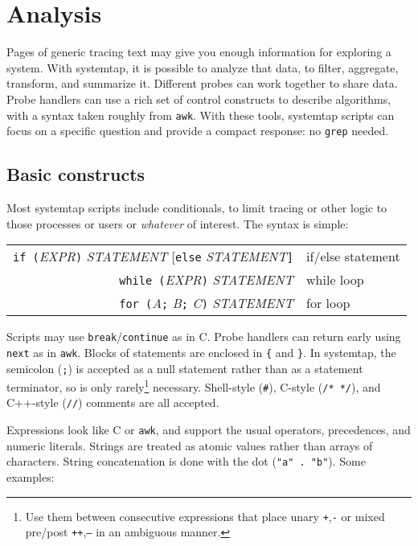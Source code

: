 \documentclass{article}
\renewcommand{\nomenclature}[2]{}
\begin{document}
\section{Analysis}

Pages of generic tracing text may give you enough information for
exploring a system.  With systemtap, it is possible to analyze that
data, to filter, aggregate, transform, and summarize it.  Different
probes can work together to share data.  Probe handlers can use a rich
set of control constructs to describe algorithms, with a syntax taken
roughly from \verb+awk+.  With these tools, systemtap scripts can
focus on a specific question and provide a compact response: no
\verb+grep+ needed.
\nomenclature{awk}{A classic UNIX stream processing language.}

\subsection{Basic constructs}

Most systemtap scripts include conditionals, to limit tracing or other
logic to those processes or users or {\em whatever} of interest.  The
syntax is simple:

\begin{tabular}{rl}
\verb+if (+{\em EXPR}\verb+)+ {\em STATEMENT} [\verb+else+ {\em STATEMENT}\verb+]+ & if/else statement \\
\verb+while (+{\em EXPR}\verb+)+ {\em STATEMENT} & while loop \\
\verb+for (+{\em A}\verb+;+ {\em B}\verb+;+ {\em C}\verb+)+ {\em STATEMENT} & for loop \\
\end{tabular}

Scripts may use \verb+break+/\verb+continue+ as in C.
Probe handlers can return early using \verb+next+ as in \verb+awk+.
Blocks of statements are enclosed in \verb+{+ and \verb+}+.  In
systemtap, the semicolon (\verb+;+) is accepted as a null statement
rather than as a statement terminator, so is only rarely\footnote{Use
them between consecutive expressions that place unary {\tt +},{\tt -}
or mixed pre/post {\tt ++},{\tt --} in an ambiguous manner.}
necessary.  Shell-style (\verb+#+), C-style (\verb+/* */+), and
C++-style (\verb+//+) comments are all accepted.

Expressions look like C or \verb+awk+, and support the usual
operators, precedences, and numeric literals.  Strings are treated as
atomic values rather than arrays of characters.  String concatenation
is done with the dot (\verb+"a" . "b"+).  Some examples:
\end{document}
